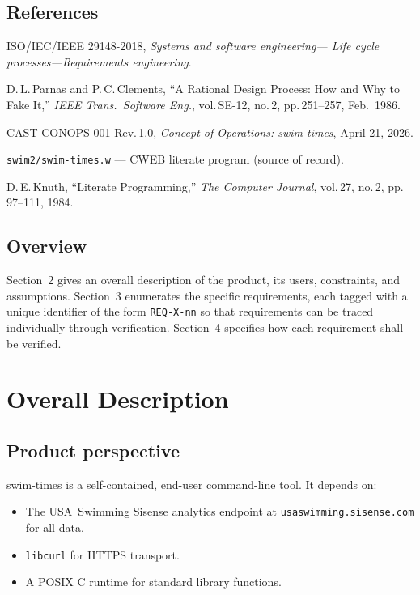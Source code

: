 \documentclass[12pt]{article}
\newcommand{\code}[1]{\texttt{#1}}
\begin{document}
\subsection{References}

\begin{enumerate}[label={[\arabic*]}]
  \item ISO/IEC/IEEE 29148-2018, \textit{Systems and software engineering---
        Life cycle processes---Requirements engineering}.
  \item D.\,L.\,Parnas and P.\,C.\,Clements, ``A Rational Design Process:
        How and Why to Fake It,'' \textit{IEEE Trans.\ Software Eng.},
        vol.\,SE-12, no.\,2, pp.\,251--257, Feb.\ 1986.
  \item CAST-CONOPS-001 Rev.\,1.0, \textit{Concept of Operations:
        swim-times}, April 21, 2026.
  \item \code{swim2/swim-times.w} --- CWEB literate program (source of record).
  \item D.\,E.\,Knuth, ``Literate Programming,''
        \textit{The Computer Journal}, vol.\,27, no.\,2,
        pp.\,97--111, 1984.
\end{enumerate}

\subsection{Overview}

Section~2 gives an overall description of the product, its users,
constraints, and assumptions.  Section~3 enumerates the specific
requirements, each tagged with a unique identifier of the form
\code{REQ-X-nn} so that requirements can be traced individually
through verification.  Section~4 specifies how each requirement
shall be verified.

\section{Overall Description}

\subsection{Product perspective}

swim-times is a self-contained, end-user command-line tool.
It depends on:

\begin{itemize}
  \item The USA~Swimming Sisense analytics endpoint at
        \texttt{usaswimming.sisense.com} for all data.
  \item \code{libcurl} for HTTPS transport.
  \item A POSIX C runtime for standard library functions.
\end{itemize}
\end{document}
